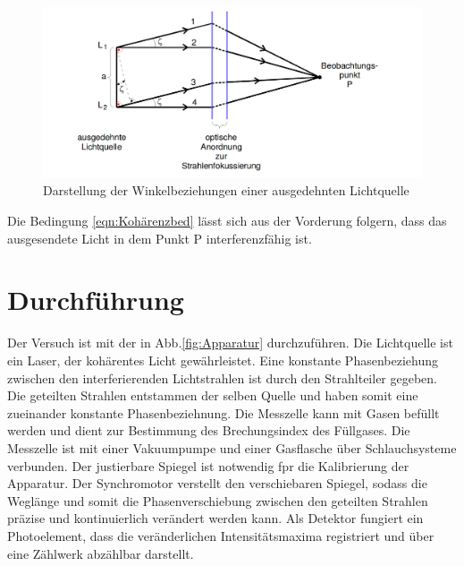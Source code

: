 \begin{figure}
  \centering
  \includegraphics[width=\textwidth]{ausgedehnte_Quelle.png}
  \caption{Darstellung der Winkelbeziehungen einer ausgedehnten Lichtquelle\cite{sample}}
  \label{fig:ausgedehnte_Quelle}
\end{figure}

Die Bedingung \eqref{eqn:Kohärenzbed} lässt sich aus der Vorderung folgern, dass
das ausgesendete Licht in dem Punkt P interferenzfähig ist.


\section{Durchführung}

Der Versuch ist mit der in Abb.\ref{fig:Apparatur} durchzuführen.
Die Lichtquelle ist ein Laser, der kohärentes Licht gewährleistet.
Eine konstante Phasenbeziehung zwischen den interferierenden Lichtstrahlen ist
durch den Strahlteiler gegeben. Die geteilten Strahlen entstammen der selben Quelle
und haben somit eine zueinander konstante Phasenbeziehnung.
Die Messzelle kann mit Gasen befüllt werden und dient zur Bestimmung
des Brechungsindex des Füllgases. Die Messzelle ist mit einer Vakuumpumpe und einer
Gasflasche über Schlauchsysteme verbunden.
Der justierbare Spiegel ist notwendig
fpr die Kalibrierung der Apparatur. Der Synchromotor verstellt den
verschiebaren Spiegel, sodass die Weglänge und somit die Phasenverschiebung
zwischen den geteilten Strahlen präzise und kontinuierlich verändert werden kann.
Als Detektor fungiert ein Photoelement, dass die veränderlichen Intensitätsmaxima
registriert und über eine Zählwerk abzählbar darstellt.

